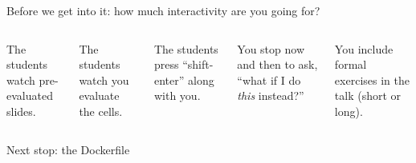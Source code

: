 \documentclass[aspectratio=169]{beamer}
\begin{document}
\begin{frame}{Before we get into it: how much interactivity are you going for?}
\begin{columns}
The students watch pre-evaluated slides.

\vspace{0.5 cm}
The students watch you evaluate the cells.

\vspace{0.5 cm}
The students press ``shift-enter'' along with you.

\vspace{0.5 cm}
You stop now and then to ask, ``what if I do {\it this} instead?''

\vspace{0.5 cm}
You include formal exercises in the talk (short or long).
\end{columns}
\end{frame}

\begin{frame}{}
\LARGE
\vspace{1 cm}

\centering Next stop: the Dockerfile

\end{frame}
\end{document}
